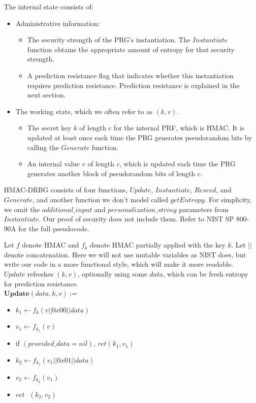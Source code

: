 \documentclass[12pt,lot, lof]{puthesis}
\newenvironment{game}
{ \begin{itemize}[noitemsep,nolistsep] 
}
{ \end{itemize}                  }
\newcommand{\s} {\textrm{ }}
\newcommand{\lar}{\leftarrow}
\begin{document}
The internal state consists of:

\begin{itemize}
\item Administrative information:
  \begin{itemize}
  \item The security strength of the PRG's instantiation. The $Instantiate$ function obtains the appropriate amount of entropy for that security strength.
  \item A prediction resistance flag that indicates whether this instantiation requires prediction resistance. Prediction resistance is explained in the next section.
  \end{itemize}

  \item The working state, which we often refer to as $(k,v)$.
  \begin{itemize}
  \item The secret key $k$ of length $c$ for the internal PRF, which is HMAC. It is updated at least once each time the PRG generates pseudorandom bits by calling the $Generate$ function.
  \item An internal value $v$ of length $c$, which is updated each time the PRG generates another block of pseudorandom bits of length $c$.
  \end{itemize}

\end{itemize}

HMAC-DRBG consists of four functions, $Update$, $Instantiate$, $Reseed$, and $Generate$, and another function we don't model called $getEntropy$. For simplicity, we omit the $additional\_input$ and $personalization\_string$ parameters from $Instantiate$. Our proof of security does not include them. Refer to NIST SP 800-90A for the full pseudocode. 

Let $f$ denote HMAC and $f_k$ denote HMAC partially applied with the key $k$. Let $||$ denote concatenation. Here we will not use mutable variables as NIST does, but write our code in a more functional style, which will make it more readable.\\

$Update$ refreshes $(k, v)$, optionally using some $data$, which can be fresh entropy for prediction resistance.\\

$\textbf{Update}(data, k, v) := $
\begin{game}
\item[] $k_1 \lar f_k(v || 0x00 || data)$
\item[] $v_1 \lar f_{k_1}(v)$
\item[] if $(provided\_data = nil)$, $ret (k_1, v_1)$
\item[] $k_2 \lar f_{k_1}(v_1 || 0x01 || data)$
\item[] $v_2 \lar f_{k_2}(v_1)$
\item[] $ret \s (k_2, v_2)$\\
\end{game}
\end{document}
